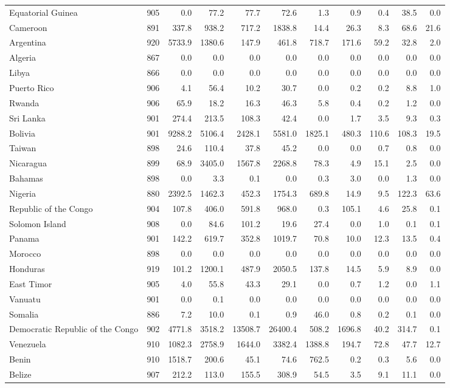 \begin{center}
\begin{scriptsize}
\begin{longtable}[ht]{lrrrrrrrrrr}
			Equatorial Guinea&905&0.0&77.2&77.7&72.6&1.3&0.9&0.4&38.5&0.0\\
			Cameroon&891&337.8&938.2&717.2&1838.8&14.4&26.3&8.3&68.6&21.6\\
			Argentina&920&5733.9&1380.6&147.9&461.8&718.7&171.6&59.2&32.8&2.0\\
			Algeria&867&0.0&0.0&0.0&0.0&0.0&0.0&0.0&0.0&0.0\\
			Libya&866&0.0&0.0&0.0&0.0&0.0&0.0&0.0&0.0&0.0\\
			Puerto Rico&906&4.1&56.4&10.2&30.7&0.0&0.2&0.2&8.8&1.0\\
			Rwanda&906&65.9&18.2&16.3&46.3&5.8&0.4&0.2&1.2&0.0\\
			Sri Lanka&901&274.4&213.5&108.3&42.4&0.0&1.7&3.5&9.3&0.3\\
			Bolivia&901&9288.2&5106.4&2428.1&5581.0&1825.1&480.3&110.6&108.3&19.5\\
			Taiwan&898&24.6&110.4&37.8&45.2&0.0&0.0&0.7&0.8&0.0\\
			Nicaragua&899&68.9&3405.0&1567.8&2268.8&78.3&4.9&15.1&2.5&0.0\\
			Bahamas&898&0.0&3.3&0.1&0.0&0.3&3.0&0.0&1.3&0.0\\
			Nigeria&880&2392.5&1462.3&452.3&1754.3&689.8&14.9&9.5&122.3&63.6\\
			Republic of the Congo&904&107.8&406.0&591.8&968.0&0.3&105.1&4.6&25.8&0.1\\
			Solomon Island&908&0.0&84.6&101.2&19.6&27.4&0.0&1.0&0.1&0.1\\
			Panama&901&142.2&619.7&352.8&1019.7&70.8&10.0&12.3&13.5&0.4\\
			Morocco&898&0.0&0.0&0.0&0.0&0.0&0.0&0.0&0.0&0.0\\
			Honduras&919&101.2&1200.1&487.9&2050.5&137.8&14.5&5.9&8.9&0.0\\
			East Timor&905&4.0&55.8&43.3&29.1&0.0&0.7&1.2&0.0&1.1\\
			Vanuatu&901&0.0&0.1&0.0&0.0&0.0&0.0&0.0&0.0&0.0\\
			Somalia&886&7.2&10.0&0.1&0.9&46.0&0.8&0.2&0.1&0.0\\
			Democratic Republic of the Congo&902&4771.8&3518.2&13508.7&26400.4&508.2&1696.8&40.2&314.7&0.1\\
			Venezuela&910&1082.3&2758.9&1644.0&3382.4&1388.8&194.7&72.8&47.7&12.7\\
			Benin&910&1518.7&200.6&45.1&74.6&762.5&0.2&0.3&5.6&0.0\\
			Belize&907&212.2&113.0&155.5&308.9&54.5&3.5&9.1&11.1&0.0\\

\end{longtable}
\end{scriptsize}
\end{center}
